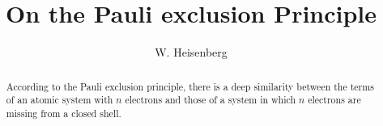 \begin{paper}{1}
\begin{header}
\title{On the Pauli exclusion Principle}
\author{W. Heisenberg}
\makeheader
\end{header}

\begin{abstract}
According to the Pauli exclusion principle, there is a deep similarity between the terms of an atomic system with $n$ electrons and those of a system in which $n$ electrons are missing from a closed shell.
\end{abstract}
\end{paper}